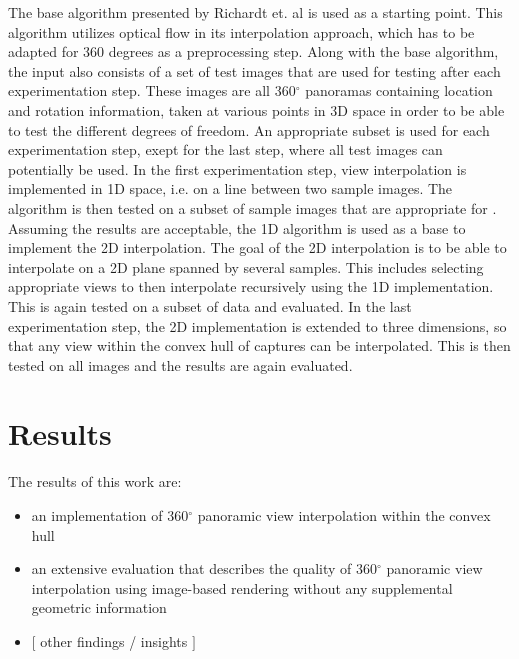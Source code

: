 The base algorithm presented by Richardt et. al \cite{megastereo} is used as a starting point. This algorithm utilizes optical flow in its interpolation approach, which has to be adapted for 360 degrees as a preprocessing step. Along with the base algorithm, the input also consists of a set of test images that are used for testing after each experimentation step. These images are all 360$^{\circ}$ panoramas containing location and rotation information, taken at various points in 3D space in order to be able to test the different degrees of freedom. An appropriate subset is used for each experimentation step, exept for the last step, where all test images can potentially be used.
In the first experimentation step, view interpolation is implemented in 1D space, i.e. on a line between two sample images. The algorithm is then tested on a subset of sample images that are appropriate for . Assuming the results are acceptable, the 1D algorithm is used as a base to implement the 2D interpolation. The goal of the 2D interpolation is to be able to interpolate on a 2D plane spanned by several samples. This includes selecting appropriate views to then interpolate recursively using the 1D implementation. This is again tested on a subset of data and evaluated. In the last experimentation step, the 2D implementation is extended to three dimensions, so that any view within the convex hull of captures can be interpolated. This is then tested on all images and the results are again evaluated.

\section*{Results}

The results of this work are:
\begin{itemize}
\item an implementation of 360$^{\circ}$ panoramic view interpolation within the convex hull
\item an extensive evaluation that describes the quality of 360$^{\circ}$ panoramic view interpolation using image-based rendering without any supplemental geometric information
\item $[$ other findings / insights $]$
\end{itemize}


